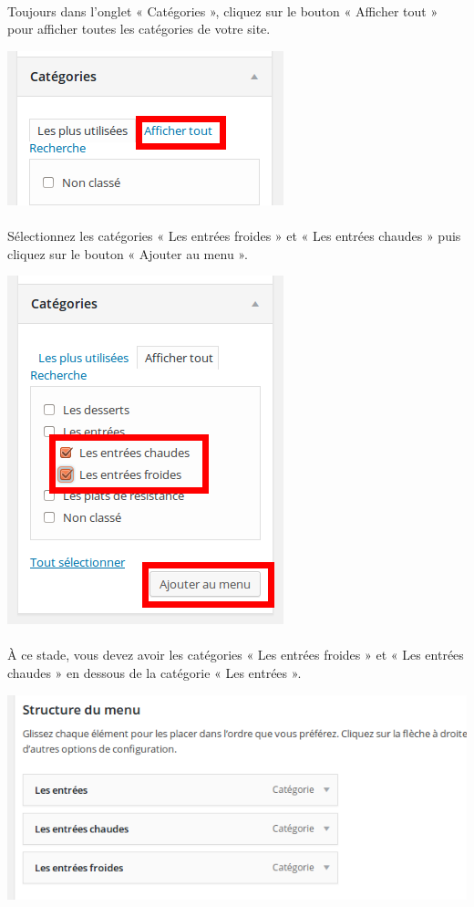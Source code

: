 \documentclass[10pt,a4paper]{article}
\begin{document}
\paragraph{}Toujours dans l'onglet « Catégories », cliquez sur le bouton « Afficher tout » pour afficher toutes les catégories de votre site.
\begin{center}
\includegraphics[scale=0.3]{img/0150.png}
\end{center}
\paragraph{}Sélectionnez les catégories « Les entrées froides » et « Les entrées chaudes » puis cliquez sur le bouton « Ajouter au menu ».
\begin{center}
\includegraphics[scale=0.3]{img/0152.png}
\end{center}
\paragraph{}À ce stade, vous devez avoir les catégories « Les entrées froides » et « Les entrées chaudes » en dessous de la catégorie « Les entrées ».
\begin{center}
\includegraphics[scale=0.3]{img/0153.png}
\end{center}
\end{document}
